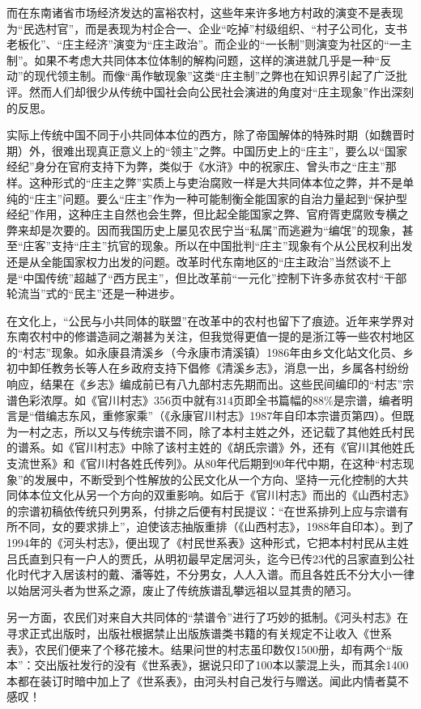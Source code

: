 \documentclass[a4paper,12pt,punct=kaiming]{ctexart}
\begin{document}
而在东南诸省市场经济发达的富裕农村，这些年来许多地方村政的演变不是表现为“民选村官”，而是表现为村企合一、企业“吃掉”村级组织、“村子公司化，支书老板化”、“庄主经济”演变为“庄主政治”。而企业的“一长制”则演变为社区的“一主制”。如果不考虑大共同体本位体制的解构问题，这样的演进就几乎是一种“反动”的现代领主制。而像“禹作敏现象”这类“庄主制”之弊也在知识界引起了广泛批评。然而人们却很少从传统中国社会向公民社会演进的角度对“庄主现象”作出深刻的反思。

实际上传统中国不同于小共同体本位的西方，除了帝国解体的特殊时期（如魏晋时期）外，很难出现真正意义上的“领主”之弊。中国历史上的“庄主”，要么以“国家经纪”身分在官府支持下为弊，类似于《水浒》中的祝家庄、曾头市之“庄主”那样。这种形式的“庄主之弊”实质上与吏治腐败一样是大共同体本位之弊，并不是单纯的“庄主”问题。要么“庄主”作为一种可能制衡全能国家的自治力量起到“保护型经纪”作用，这种庄主自然也会生弊，但比起全能国家之弊、官府胥吏腐败专横之弊来却是次要的。因而我国历史上屡见农民宁当“私属”而逃避为“编氓”的现象，甚至“庄客”支持“庄主”抗官的现象。所以在中国批判“庄主”现象有个从公民权利出发还是从全能国家权力出发的问题。改革时代东南地区的“庄主政治”当然谈不上是“中国传统”超越了“西方民主”，但比改革前“一元化”控制下许多赤贫农村“干部轮流当”式的“民主”还是一种进步。

在文化上，“公民与小共同体的联盟”在改革中的农村也留下了痕迹。近年来学界对东南农村中的修谱造祠之潮甚为关注，但我觉得更值一提的是浙江等一些农村地区的“村志”现象。如永康县清溪乡（今永康市清溪镇）1986年由乡文化站文化员、乡初中卸任教务长等人在乡政府支持下倡修《清溪乡志》，消息一出，乡属各村纷纷响应，结果在《乡志》编成前已有八九部村志先期而出。这些民间编印的“村志”宗谱色彩浓厚。如《官川村志》356页中就有314页即全书篇幅的88\%是宗谱，编者明言是“借编志东风，重修家乘”（《永康官川村志》1987年自印本宗谱页第四）。但既为一村之志，所以又与传统宗谱不同，除了本村主姓之外，还记载了其他姓氏村民的谱系。如《官川村志》中除了该村主姓的《胡氏宗谱》外，还有《官川其他姓氏支流世系》和《官川村各姓氏传列》。从80年代后期到90年代中期，在这种“村志现象”的发展中，不断受到个性解放的公民文化从一个方向、坚持一元化控制的大共同体本位文化从另一个方向的双重影响。如后于《官川村志》而出的《山西村志》的宗谱初稿依传统只列男系，付排之后便有村民提议：“在世系排列上应与宗谱有所不同，女的要求排上”，迫使该志抽版重排（《山西村志》，1988年自印本）。到了1994年的《河头村志》，便出现了《村民世系表》这种形式，它把本村村民从主姓吕氏直到只有一户人的贾氏，从明初最早定居河头，迄今已传23代的吕家直到公社化时代才入居该村的戴、潘等姓，不分男女，人人入谱。而且各姓氏不分大小一律以始居河头者为世系之源，废止了传统族谱乱攀远祖以显其贵的陋习。

另一方面，农民们对来自大共同体的“禁谱令”进行了巧妙的抵制。《河头村志》在寻求正式出版时，出版社根据禁止出版族谱类书籍的有关规定不让收入《世系表》，农民们便来了个移花接木。结果问世的村志虽印数仅1500册，却有两个“版本”：交出版社发行的没有《世系表》，据说只印了100本以蒙混上头，而其余1400本都在装订时暗中加上了《世系表》，由河头村自己发行与赠送。闻此内情者莫不感叹！
\end{document}
